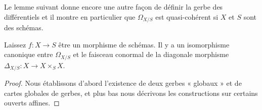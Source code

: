 \noindent
Le lemme suivant donne encore une autre façon de définir la gerbe des différentiels et il montre en particulier que $\Omega_{X/S}$ est quasi-cohérent si $X$ et $S$ sont des schémas.

\begin{lemma}

\label{lemma-differentials-diagonal}
Laissez $f : X \to S$ être un morphisme de schémas. Il y a un isomorphisme canonique entre $\Omega_{X/S}$ et le faisceau conormal de la diagonale morphisme $\Delta_{X/S} : X \longrightarrow X \times_S X$.
\end{lemma}

\begin{proof}
Nous établissons d'abord l'existence de deux gerbes « globaux » et de cartes globales de gerbes, et plus bas nous décrivons les constructions sur certains ouverts affines.

\medskip\noindent


\end{proof}
